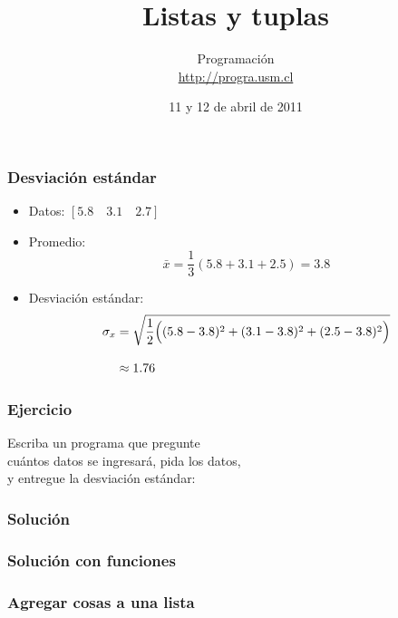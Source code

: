 \documentclass[12pt]{beamer}
\title{Listas y tuplas}
\author{
  Programación \\ \url{http://progra.usm.cl}
}
\date{11 y 12 de abril de 2011}
\begin{document}
  \begin{frame}
    \maketitle
  \end{frame}

  \begin{frame}
    \frametitle{Desviación estándar}
    \label{def-desviacion}
    \begin{itemize}
      \item Datos: \([5.8\quad 3.1\quad 2.7]\)
      \item Promedio:
        \[
          \bar{x} =
          \frac{1}{3}
          (5.8 + 3.1 + 2.5) = 3.8
        \]
      \item Desviación estándar:
        \begin{align*}
          \sigma_x &=
          \sqrt{
            \frac{1}{2}
            \Bigl(
              (5.8 - 3.8)^2 +
              (3.1 - 3.8)^2 +
              (2.5 - 3.8)^2
            \Bigr)
          } \\[2ex]
          &\approx 1.76
        \end{align*}
    \end{itemize}

  \end{frame}

  \begin{frame}
    \label{ejercicio-desviacion}
    \frametitle{Ejercicio}
    Escriba un programa que pregunte \\
    cuántos datos se ingresará, pida los datos, \\
    y entregue la desviación estándar:
    
  \end{frame}

  \begin{frame}
    \label{programa-desviacion}
    \frametitle{Solución}
    \footnotesize
    
  \end{frame}

  \begin{frame}
    \label{programa-desviacion-funciones}
    \frametitle{Solución con funciones}
    \tiny
    
  \end{frame}

  \begin{frame}
    \label{listas-agregar}
    \frametitle{Agregar cosas a una lista}
    
  \end{frame}
\end{document}
